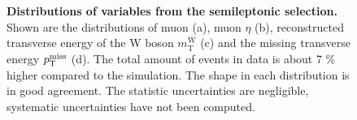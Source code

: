 \begin{figure}[!ht]
   \begin{minipage}{\textwidth}
     \centering
     \quad
     \\
     \quad
     
   \end{minipage}\\[1em]
	\caption[Distributions of Variables from the Semileptonic Selection]{\textbf{Distributions of variables from the semileptonic selection.} Shown are the distributions of muon \pt (a), muon $\eta$ (b), reconstructed transverse energy of the W boson $m^\textrm{W}_\textrm{T}$ (c) and the missing transverse energy $p_\mathrm{T}^\textrm{miss}$ (d). The total amount of events in data is about 7 \% higher compared to the simulation. The shape in each distribution is in good agreement. The statistic uncertainties are negligible, systematic uncertainties have not been computed.}
	\label{fig:ch_6_semilepDist}
\end{figure}


